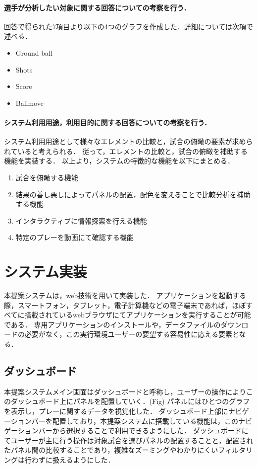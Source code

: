 \documentclass[sotsuron]{kuee}
\begin{document}
					\paragraph {選手が分析したい対象に関する回答についての考察を行う．}
						回答で得られた7項目より以下の4つのグラフを作成した．詳細については次項で述べる．
							\begin{itemize}
								\item Ground ball
								\item Shots
								\item Score
								\item Ballmove
							\end{itemize}
					\paragraph {システム利用用途，利用目的に関する回答についての考察を行う．}
						システム利用用途として様々なエレメントの比較と，試合の俯瞰の要素が求められていると考えられる．
						従って，エレメントの比較と，試合の俯瞰を補助する機能を実装する．
						以上より，システムの特徴的な機能を以下にまとめる．
						\begin{enumerate}	
							\item 試合を俯瞰する機能
							\item 結果の善し悪しによってパネルの配置，配色を変えることで比較分析を補助する機能
							\item インタラクティブに情報探索を行える機能
							\item 特定のプレーを動画にて確認する機能
						\end{enumerate}
	\section{システム実装}
			本提案システムは，web技術を用いて実装した．
			アプリケーションを起動する際，スマートフォン，タブレット，電子計算機などの電子端末であれば，ほぼすべてに搭載されているwebブラウザにてアプリケーションを実行することが可能である．
			専用アプリケーションのインストールや，データファイルのダウンロードの必要がなく，この実行環境ユーザーの要望する容易性に応える要素となる．
		\subsection{ダッシュボード}
			本提案システムメイン画面はダッシュボードと呼称し，ユーザーの操作によりこのダッシュボード上にパネルを配置していく．(Fig)
			パネルにはひとつのグラフを表示し，プレーに関するデータを視覚化した．
			ダッシュボード上部にナビゲーションバーを配置しており，本提案システムに搭載している機能は，このナビゲーションバーから選択することで利用できるようにした．
			ダッシュボードにてユーザーが主に行う操作は対象試合を選びパネルの配置することと，配置されたパネル間の比較することであり，複雑なズーミングやわかりにくいフィルタリングは行わずに扱えるようにした．
\end{document}
